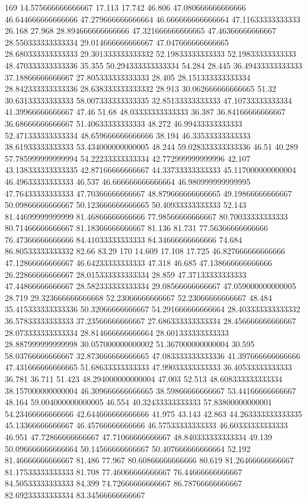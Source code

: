 169 14.575666666666667 17.113 17.742 46.806 47.080666666666666 46.644666666666666 47.279666666666664 46.666666666666664 47.11633333333333 26.168 27.968 28.894666666666666 47.321666666666665 47.46366666666667 28.550333333333334 29.014666666666667 47.047666666666665 28.680333333333333 29.301333333333332 52.19833333333333 52.19833333333333 48.470333333333336 35.355 50.294333333333334 54.284 28.445 36.49433333333333 37.18866666666667 27.805333333333333 28.405 28.151333333333334 28.842333333333336 28.638333333333332 28.913 30.062666666666665 51.32 30.63133333333333 58.007333333333335 32.85133333333333 47.10733333333334 41.39966666666667 47.46 51.68 48.03333333333333 36.387 36.84166666666667 36.68666666666667 51.40633333333333 48.272 46.99433333333333 52.471333333333334 48.659666666666666 38.194 46.33533333333333 38.61933333333333 53.434000000000005 48.244 59.028333333333336 46.51 40.289 57.785999999999994 54.22233333333334 42.772999999999996 42.107 43.138333333333335 42.87166666666667 44.33733333333333 45.117000000000004 46.49633333333333 46.537 46.666666666666664 46.980999999999995 47.76433333333333 47.70366666666667 48.879666666666665 49.19866666666667 50.09866666666667 50.123666666666665 50.40933333333333 52.143 81.44699999999999 81.46866666666666 77.98566666666667 80.70033333333333 80.71466666666667 81.18366666666667 81.136 81.731 77.56366666666666 76.47366666666666 84.41033333333333 84.34666666666666 74.684 86.80533333333332 82.66 83.29
170 14.609 17.108 17.725 46.827666666666666 47.12866666666667 46.64233333333333 47.318 46.685 47.138666666666666 26.22866666666667 28.015333333333334 28.859 47.37133333333333 47.44866666666667 28.582333333333334 29.08566666666667 47.059000000000005 28.719 29.323666666666668 52.23066666666667 52.23066666666667 48.484 35.415333333333336 50.32066666666667 54.291666666666664 28.403333333333332 36.57833333333333 37.23566666666667 27.686333333333334 28.456666666666667 28.073333333333334 28.814666666666664 28.601333333333333 28.887999999999998 30.057000000000002 51.367000000000004 30.595 58.03766666666667 32.873666666666665 47.083333333333336 41.397666666666666 47.431666666666665 51.68633333333333 47.99033333333333 36.40533333333333 36.781 36.711 51.423 48.294000000000004 47.003 52.513 48.608333333333334 38.157000000000004 46.309666666666665 38.59866666666667 53.44166666666667 48.164 59.004000000000005 46.554 40.32433333333333 57.83800000000001 54.23466666666666 42.644666666666666 41.975 43.143 42.863 44.263333333333335 45.13366666666667 46.45766666666666 46.57533333333333 46.60333333333333 46.951 47.72866666666667 47.71066666666667 48.840333333333334 49.139 50.096666666666664 50.14566666666667 50.407666666666664 52.192 81.46666666666667 81.486 77.967 80.60866666666666 80.619 81.26466666666667 81.17533333333333 81.708 77.46066666666667 76.44666666666667 84.50533333333333 84.399 74.72666666666667 86.78766666666667 82.69233333333334 83.34566666666667
